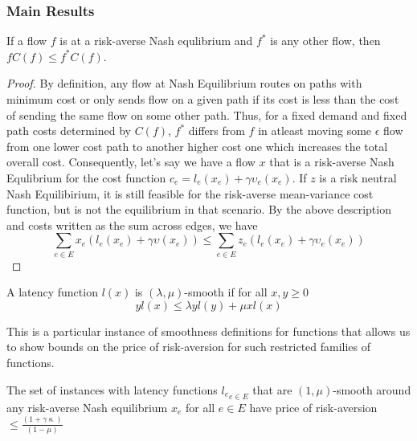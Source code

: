 \subsubsection{Main Results}
\begin{theorem}
    If a flow $f$ is at a risk-averse Nash equlibrium and $f^*$ is any other flow, then $fC(f)\leq f^*C(f)$. 
    \label{variational}
\end{theorem}

\begin{proof}
    By definition, any flow at Nash Equilibrium routes on paths with minimum cost or only sends flow on a given path if its cost is less than
    the cost of sending the same flow on some other path. Thus, for a fixed demand and fixed path costs determined by $C(f)$, $f^*$ differs from $f$ in 
    atleast moving some $\epsilon$ flow from one lower cost path to another higher cost one which increases the total overall cost. 
    Consequently, let's say we have a flow $x$ that is a risk-averse Nash Equlibrium 
    for the cost function $c_e = l_e(x_e) +\gamma \upsilon_e(x_e)$. If $z$ is a risk neutral Nash Equilibirium, it is still feasible for the risk-averse
    mean-variance cost function, but is not the equilibrium in that scenario. By the above description and costs written as the sum across edges, we have
    $$\sum_{e \in E}x_e(l_e(x_e) + \gamma \upsilon(x_e)) \leq \sum_{e \in E} z_e(l_e(x_e) + \gamma \upsilon_e(x_e))$$
\end{proof}

\begin{definition}
    A latency function $l(x)$ is $(\lambda, \mu)$-smooth if for all $x, y \geq 0$ $$ yl(x) \leq \lambda yl(y) + \mu x l(x)$$
    
    This is a particular instance of smoothness definitions for functions that allows us to show bounds on the price of risk-aversion for such restricted families of functions. 
\end{definition}

\begin{theorem}
    The set of instances with latency functions ${l_e}_{e \in E}$ that are $(1,\mu)$-smooth around any risk-averse Nash equilibrium $x_e$ for all $e \in E$ have price of risk-aversion
    $\leq \displaystyle \frac{(1 + \gamma \upkappa)}{(1 - \mu)}$
\end{theorem}

